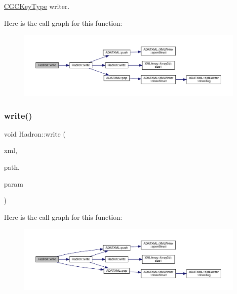 \mbox{\hyperlink{structHadron_1_1CGCKeyType}{C\+G\+C\+Key\+Type}} writer. 

Here is the call graph for this function\+:\nopagebreak
\begin{figure}[H]
\begin{center}
\leavevmode
\includegraphics[width=350pt]{d1/daf/namespaceHadron_a4073084eccc97c67b860f51e4efd91e0_cgraph}
\end{center}
\end{figure}
\mbox{\label{namespaceHadron_a3ba652c4917e69b9056f2dd7621483df}} 
\subsubsection{\texorpdfstring{write()}{write()}\hspace{0.1cm}{\footnotesize\ttfamily [3/95]}}
{\footnotesize\ttfamily void Hadron\+::write (\begin{DoxyParamCaption}\item[{\mbox{\hyperlink{classADATXML_1_1XMLWriter}{X\+M\+L\+Writer}} \&}]{xml,  }\item[{const std\+::string \&}]{path,  }\item[{const \mbox{\hyperlink{structHadron_1_1HadronNptType__t}{Hadron\+Npt\+Type\+\_\+t}} \&}]{param }\end{DoxyParamCaption})}

Here is the call graph for this function\+:\nopagebreak
\begin{figure}[H]
\begin{center}
\leavevmode
\includegraphics[width=350pt]{d1/daf/namespaceHadron_a3ba652c4917e69b9056f2dd7621483df_cgraph}
\end{center}
\end{figure}
\mbox{\label{namespaceHadron_a1df6238e1c6eca70a3e05655f2680904}} 
